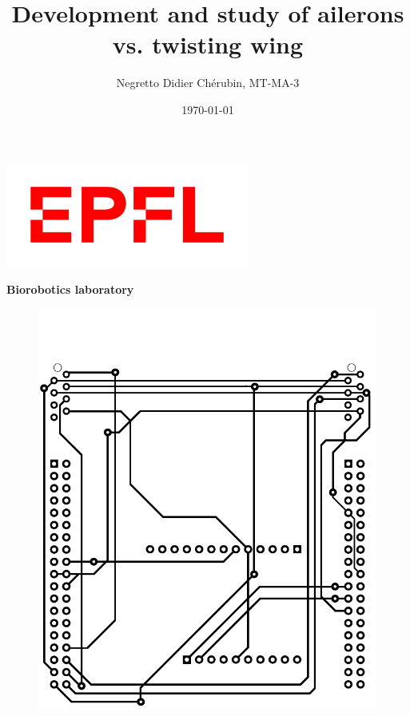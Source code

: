 \documentclass[12pt,a4paper]{article}
\title{Development and study of ailerons vs. twisting wing}
\author{\large{Negretto Didier Chérubin, MT-MA-3}}
\begin{document}
	\date{\today}
\begin{titlepage}
\hspace{+2.8cm} %
\pagecolor{titlepagecolor}
\noindent
\begin{center}
\includegraphics[width=8cm]{fig/EPFL_Logo_Digital_RGB_PROD.jpg}\\[-1em]
\color{black}
\par
\noindent
\hspace{-30cm}
\makebox[3pt][l]{\rule{19 cm}{1pt}}
\par
\noindent
\textbf{\Large \textsf{Biorobotics laboratory}}\\
\end{center}
\vspace{0.5cm}
\hspace{-3.5cm}
	\begin{figure}[H]
    	\centering
		\includegraphics[width=12 cm]{fig/front.pdf}
	\end{figure}


\end{titlepage}
\end{document}
